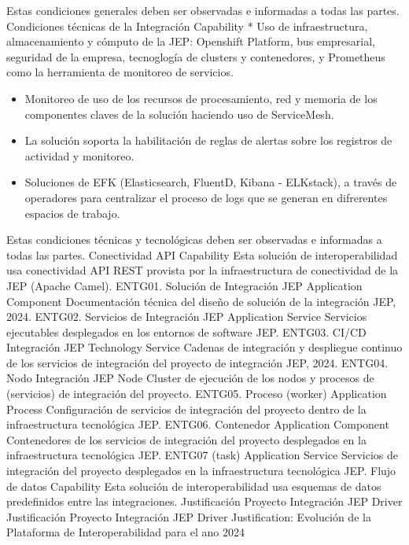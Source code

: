 \documentclass[
  paper=a4,
  ,captions=tableheading
]{scrartcl}
\begin{document}
Estas condiciones generales deben ser observadas e informadas a todas
las partes. \textbar{} \textbar{} Condiciones técnicas de la Integración
\textbar{} Capability \textbar{} * Uso de infraestructura,
almacenamiento y cómputo de la JEP: Openshift Platform, bus empresarial,
seguridad de la empresa, tecnoglogía de clusters y contenedores, y
Prometheus como la herramienta de monitoreo de servicios.

\begin{itemize}
\item
  Monitoreo de uso de los recursos de procesamiento, red y memoria de
  los componentes claves de la solución haciendo uso de ServiceMesh.
\item
  La solución soporta la habilitación de reglas de alertas sobre los
  registros de actividad y monitoreo.
\item
  Soluciones de EFK (Elasticsearch, FluentD, Kibana - ELKstack), a
  través de operadores para centralizar el proceso de logs que se
  generan en difrerentes espacios de trabajo.
\end{itemize}

Estas condiciones técnicas y tecnológicas deben ser observadas e
informadas a todas las partes. \textbar{} \textbar{} Conectividad API
\textbar{} Capability \textbar{} Esta solución de interoperabilidad usa
conectividad API REST provista por la infraestructura de conectividad de
la JEP (Apache Camel). \textbar{} \textbar{} ENTG01. Solución de
Integración JEP \textbar{} Application Component \textbar{}
Documentación técnica del diseño de solución de la integración JEP,
2024. \textbar{} \textbar{} ENTG02. Servicios de Integración JEP
\textbar{} Application Service \textbar{} Servicios ejecutables
desplegados en los entornos de software JEP. \textbar{} \textbar{}
ENTG03. CI/CD Integración JEP \textbar{} Technology Service \textbar{}
Cadenas de integración y despliegue continuo de los servicios de
integración del proyecto de integración JEP, 2024. \textbar{} \textbar{}
ENTG04. Nodo Integración JEP \textbar{} Node \textbar{} Cluster de
ejecución de los nodos y procesos de (servicios) de integración del
proyecto. \textbar{} \textbar{} ENTG05. Proceso (worker) \textbar{}
Application Process \textbar{} Configuración de servicios de integración
del proyecto dentro de la infraestructura tecnológica JEP. \textbar{}
\textbar{} ENTG06. Contenedor \textbar{} Application Component
\textbar{} Contenedores de los servicios de integración del proyecto
desplegados en la infraestructura tecnológica JEP. \textbar{} \textbar{}
ENTG07 (task) \textbar{} Application Service \textbar{} Servicios de
integración del proyecto desplegados en la infraestructura tecnológica
JEP. \textbar{} \textbar{} Flujo de datos \textbar{} Capability
\textbar{} Esta solución de interoperabilidad usa esquemas de datos
predefinidos entre las integraciones. \textbar{} \textbar{}
Justificación Proyecto Integración JEP \textbar{} Driver \textbar{}
Justificación Proyecto Integración JEP \textbar{} Driver \textbar{}
Justification: Evolución de la Plataforma de Interoperabilidad para el
ano 2024
\end{document}
